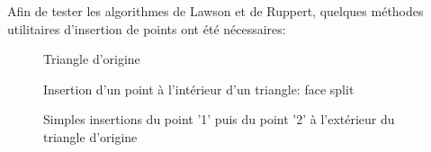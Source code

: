 Afin de tester les algorithmes de Lawson et de Ruppert, quelques méthodes utilitaires d'insertion de points ont été nécessaires:

\begin{figure}[h!]
	
	\caption{Triangle d'origine}
\end{figure}
\FloatBarrier

\begin{figure}[h!]
	
	\caption{Insertion d'un point à l'intérieur d'un triangle: face split}
\end{figure}
\FloatBarrier

\begin{figure}[h!]
	
	\caption{Simples insertions du point '1' puis du point '2' à l'extérieur du triangle d'origine}
	\label{InsertOut}
\end{figure}
\FloatBarrier